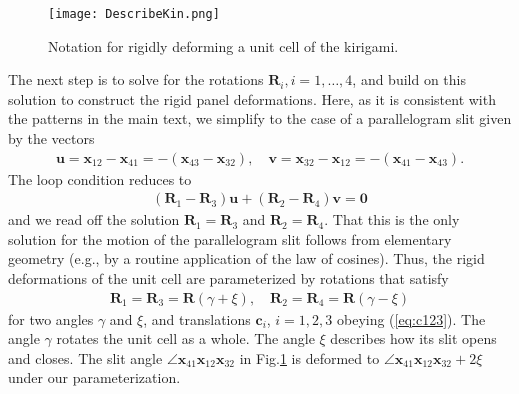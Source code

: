 \documentclass[aps,11pt,tightenlines,notitlepage,superscriptaddress,longbibliography,nofootinbib]{revtex4-1}
\begin{document}
\begin{figure}[t]
\centering
\texttt{[image: DescribeKin.png]}
\caption{Notation for rigidly deforming a unit cell of the kirigami.}
\label{fig:DescribeKin}
\end{figure}


The next step is to solve for the rotations $\mathbf{R}_i, i = 1,\ldots, 4$, and build on this solution to construct the rigid panel deformations. Here, as it is consistent with the patterns in the main text, we simplify to the case of a parallelogram slit given by the vectors
\begin{equation}
\begin{aligned}\label{eq:parallelProp}
\mathbf{u} = \mathbf{x}_{12} - \mathbf{x}_{41} = -(\mathbf{x}_{43} - \mathbf{x}_{32}) , \quad \mathbf{v} = \mathbf{x}_{32} - \mathbf{x}_{12} = -( \mathbf{x}_{41} - \mathbf{x}_{43}).
\end{aligned}
\end{equation}
The loop condition reduces to 
\begin{equation}
\begin{aligned}\label{eq:loopParallel}
(\mathbf{R}_1 - \mathbf{R}_3) \mathbf{u} + (\mathbf{R}_2 - \mathbf{R}_4) \mathbf{v} = \mathbf{0}
\end{aligned}
\end{equation}
and we read off the solution $\mathbf{R}_1 = \mathbf{R}_3$ and $\mathbf{R}_2 = \mathbf{R}_4$. That this is the only solution for the motion of the parallelogram slit follows from elementary geometry (e.g., by a routine application of the law of cosines). 
Thus, the rigid deformations of the unit cell are parameterized by rotations that satisfy
\begin{equation}\label{eq:rotations-result}
\begin{aligned}
\mathbf{R}_1 = \mathbf{R}_3 = \mathbf{R}(\gamma + \xi), \quad \mathbf{R}_2 = \mathbf{R}_4 = \mathbf{R}(\gamma - \xi)
\end{aligned}
\end{equation}
for two angles $\gamma$ and $\xi$, and translations $\mathbf{c}_{i}$, $i=1,2,3$ obeying (\ref{eq:c123}).  The angle $\gamma$ rotates the unit cell as a whole. The angle $\xi$ describes how its slit opens and closes. The slit angle $\angle \mathbf{x}_{41}\mathbf{x}_{12} \mathbf{x}_{32}$ in Fig.\;\ref{fig:DescribeKin} is deformed to $\angle \mathbf{x}_{41}\mathbf{x}_{12} \mathbf{x}_{32} + 2 \xi$ under our parameterization. 
\end{document}

